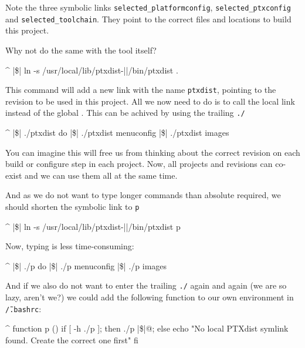 Note the three symbolic links \texttt{selected\_platformconfig},
\texttt{selected\_ptxconfig} and \texttt{selected\_toolchain}. They point to the
correct files and locations to build this project.

Why not do the same with the \ptxdist{} tool itself?

\begin{ptxshell}[escapechar=|]{^}
|\$| ln -s /usr/local/lib/ptxdist-|\releasenumber |/bin/ptxdist .
\end{ptxshell}

This command will add a new link with the name \texttt{ptxdist}, pointing to the
\ptxdist{} revision to be used in this project. All we now need to do is to call
the local link instead of the global \ptxdist{}. This can be achived by using
the trailing \texttt{./}

\begin{ptxshell}[escapechar=|]{^}
|\$| ./ptxdist do
|\$| ./ptxdist menuconfig
|\$| ./ptxdist images
\end{ptxshell}

You can imagine this will free us from thinking about the correct \ptxdist{}
revision on each build or configure step in each \ptxdist{} project. Now, all
projects and \ptxdist{} revisions can co-exist and we can use them all at the
same time.

And as we do not want to type longer commands than absolute required, we should
shorten the symbolic link to \texttt{p}

\begin{ptxshell}[escapechar=|]{^}
|\$| ln -s /usr/local/lib/ptxdist-|\releasenumber |/bin/ptxdist p
\end{ptxshell}

Now, typing is less time-consuming:

\begin{ptxshell}[escapechar=|]{^}
|\$| ./p do
|\$| ./p menuconfig
|\$| ./p images
\end{ptxshell}

And if we also do not want to enter the trailing \texttt{./} again and again (we
are so lazy, aren't we?) we could add the following function to our own
environment in \texttt{\~/.bashrc}:

\begin{ptxshell}[escapechar=|]{^}
function p ()
{
    if [ -h ./p ]; then
        ./p |\$|{@};
    else
        echo "No local PTXdist symlink found. Create the correct one first"
    fi
}
\end{ptxshell}

